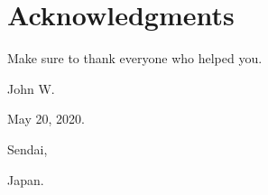 \chapter*{Acknowledgments}
\markboth{ }{ }

Make sure to thank everyone who helped you. 
\lipsum[1-10]

\vspace{5mm}

\begin{flushright}
John W. 

May 20, 2020.

Sendai,

Japan.
\end{flushright}
